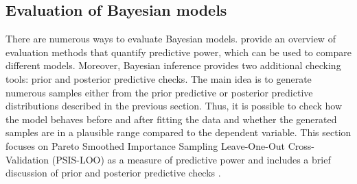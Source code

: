 \subsection{Evaluation of Bayesian models}
\label{ch:bayesian_evaluation}

There are numerous ways to evaluate Bayesian models.
\cite{piironen_comparison_2017} provide an overview of evaluation methods that quantify predictive power, which can be used to compare different models.
Moreover, Bayesian inference provides two additional checking tools: prior and posterior predictive checks.
The main idea is to generate numerous samples either from the prior predictive or posterior predictive distributions described in the previous section.
Thus, it is possible to check how the model behaves before and after fitting the data and whether the generated samples are in a plausible range compared to the dependent variable.
This section focuses on Pareto Smoothed Importance Sampling Leave-One-Out Cross-Validation (PSIS-LOO) as a measure of predictive power and includes a brief discussion of prior and posterior predictive checks \citep{vehtari_practical_2017}.

